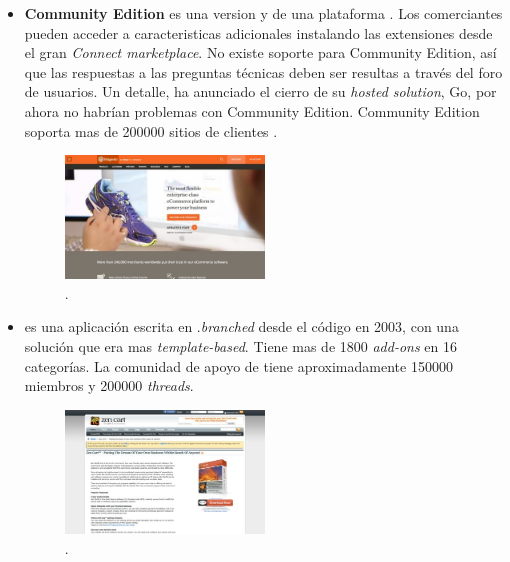\begin{itemize}
	\item \textbf{\nameMagento Community Edition} es una version \free y \opensource de  una plataforma \ecommerce. Los comerciantes pueden acceder a caracteristicas adicionales instalando las extensiones desde el gran \textit{\nameMagento Connect marketplace}. No existe soporte para \nameMagento Community Edition, así que las respuestas a las preguntas técnicas deben ser resultas a través del foro de usuarios. Un detalle, \nameMagento ha anunciado el cierro de su \textit{hosted solution}, \nameMagento Go, por ahora no habrían problemas con Community Edition. \nameMagento Community Edition soporta mas de 200000 sitios de clientes .

	\begin{figure}[H]
		\centering
		\includegraphics[width=0.5\textwidth]{figuras/cap1/MagentoWebsite.jpg}
		\caption{\nameMagento \website \cite{online_Magento}.}
	\end{figure}


	\item \textbf{\nameZenCart} es una aplicación \ecommerce \opensource escrita en \php.\nameZenCart \textit{branched} desde el código \nameOsCommerce en 2003, con una solución que era mas \textit{template-based}. Tiene mas de 1800 \textit{add-ons} en 16 categorías. La comunidad de apoyo de \nameZenCart tiene aproximadamente 150000 miembros y 200000 \textit{threads}.

	\begin{figure}[H]
		\centering
		\includegraphics[width=0.5\textwidth]{figuras/cap1/ZenCartWebsite.jpg}
		\caption{\nameZenCart \website \cite{online_ZenCart}.}
	\end{figure}



\end{itemize}
